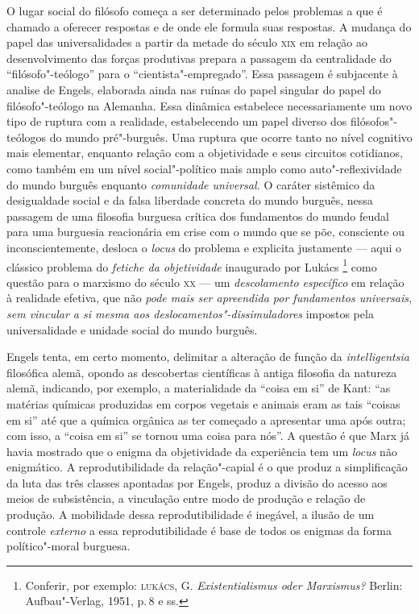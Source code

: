 O lugar social do filósofo começa a ser determinado pelos problemas a
que é chamado a oferecer respostas e de onde ele formula suas respostas.
A mudança do papel das universalidades a partir da metade do século \textsc{xix}
em relação ao desenvolvimento das forças produtivas prepara a passagem
da centralidade do ``filósofo"-teólogo'' para o ``cientista"-empregado''.
Essa passagem é subjacente à analise de Engels, elaborada ainda nas
ruínas do papel singular do papel do filósofo"-teólogo na Alemanha. Essa
dinâmica estabelece necessariamente um novo tipo de ruptura com a
realidade, estabelecendo um papel diverso dos filósofos"-teólogos do
mundo pré"-burguês. Uma ruptura que ocorre tanto no nível cognitivo mais
elementar, enquanto relação com a objetividade e seus circuitos
cotidianos, como também em um nível social"-político mais amplo como
auto"-reflexividade do mundo burguês enquanto \emph{comunidade
universal.} O caráter sistêmico da desigualdade social e da falsa
liberdade concreta do mundo burguês, nessa passagem de uma filosofia
burguesa crítica dos fundamentos do mundo feudal para uma burguesia
reacionária em crise com o mundo que se põe, consciente ou
inconscientemente, desloca o \emph{locus} do problema e explicita
justamente --- aqui o clássico problema do \emph{fetiche da objetividade}
inaugurado por Lukács \footnote{Conferir, por exemplo: \textsc{lukács}, G.
  \emph{Existentialismus oder Marxismus?} Berlin: Aufbau"-Verlag, 1951,
  p.\,8 e ss.} como questão para o marxismo do século \textsc{xx} --- um
\emph{descolamento específico} em relação à realidade efetiva, que não
\emph{pode mais ser apreendida por fundamentos universais, sem vincular
a si mesma aos deslocamentos"-dissimuladores} impostos pela
universalidade e unidade social do mundo burguês.

Engels tenta, em certo momento, delimitar a alteração de função da
\emph{intelligentsia} filosófica alemã, opondo as descobertas
científicas à antiga filosofia da natureza alemã, indicando, por
exemplo, a materialidade da ``coisa em si'' de Kant: ``as matérias
químicas produzidas em corpos vegetais e animais eram as tais ``coisas
em si'' até que a química orgânica as ter começado a apresentar uma após
outra; com isso, a ``coisa em si'' se tornou uma coisa para nós''. A
questão é que Marx já havia mostrado que o enigma da objetividade da
experiência tem um \emph{locus} não enigmático. A reprodutibilidade da
relação"-capial é o que produz a simplificação da luta das três classes
apontadas por Engels, produz a divisão do acesso aos meios de
subsistência, a vinculação entre modo de produção e relação de produção.
A mobilidade dessa reprodutibilidade é inegável, a ilusão de um controle
\emph{externo} a essa reprodutibilidade é base de todos os enigmas da
forma político"-moral burguesa.

